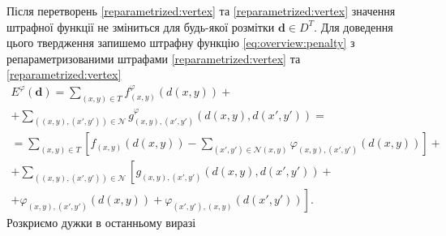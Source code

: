 Після перетворень \eqref{reparametrized:vertex} та \eqref{reparametrized:vertex}
значення штрафної функції не зміниться для будь-якої розмітки $\pmb{d} \in D^T$.
Для доведення цього твердження запишемо штрафну функцію
\eqref{eq:overview:penalty} з репараметризованими штрафами
\eqref{reparametrized:vertex} та \eqref{reparametrized:vertex}
\begin{equation*}
\begin{gathered}
    E^{\varphi} \left( \pmb{d} \right)
    = \sum \limits_{\left(x, y \right) \in T}
        f_{\left(x, y \right)}^{\varphi} \left(
            d \left(x, y \right)
        \right) + \\
    + \sum \limits_{\left(\left(x, y \right), \left(x', y'\right) \right) \in \mathcal{N}}
        g_{\left(x, y \right), \left(x', y' \right)}^{\varphi} \left(
            d \left( x, y \right), d \left( x', y' \right)
        \right) = \\
    = \sum \limits_{\left(x, y \right) \in T} \left[
        f_{\left(x, y \right)} \left( d \left(x, y \right) \right)
        - \sum \limits_{\left(x', y' \right) \in \mathcal{N} \left(x, y \right)}
            \varphi_{\left(x, y \right), \left(x', y' \right)} \left(
                d \left(x, y \right)
            \right)
        \right] + \\
        + \sum \limits_{\left(\left(x, y \right), \left(x', y'\right) \right) \in \mathcal{N}}
            \left[
                g_{\left(x, y \right), \left(x', y' \right)} \left(
                    d \left(x, y \right), d \left(x', y' \right)
                \right) + \right. \\
                \left.
                + \varphi_{\left(x, y \right), \left(x', y' \right)}
                    \left( d \left(x, y \right)
                \right)
                + \varphi_{\left(x', y' \right), \left(x, y \right)}
                    \left( d \left(x', y' \right)
                \right)
            \right].
\end{gathered}
\end{equation*}
Розкриємо дужки в останньому виразі
